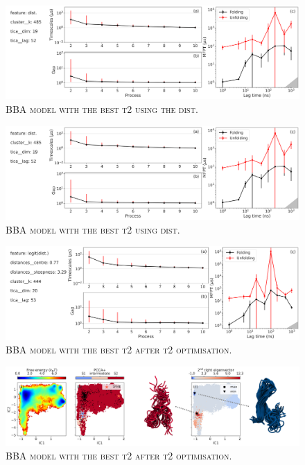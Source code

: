 \documentclass{article}
\begin{document}
\begin{figure}
    \centering
    \includegraphics[width=\columnwidth]{SI_figures/BBA_58_SI-1.png}
    \caption{\textsc{BBA model with the best t2 using the dist.}}
    \label{si_fig:BBA_58_1}
\end{figure}

\begin{figure}
    \centering
    \includegraphics[width=\columnwidth]{SI_figures/BBA_58_SI-1.png}
    \caption{\textsc{BBA model with the best t2 using dist.}}
    \label{si_fig:BBA_58_2}
\end{figure}

\begin{figure}
    \centering
    \includegraphics[width=\columnwidth]{SI_figures/BBA_227_SI-1.png}
    \caption{\textsc{BBA model with the best t2 after t2 optimisation.}}
    \label{si_fig:BBA_227_2}
\end{figure}

\begin{figure}
    \centering
    \includegraphics[width=\columnwidth]{SI_figures/BBA_227_SI-2.png}
    \caption{\textsc{BBA model with the best t2 after t2 optimisation.}}
    \label{si_fig:BBA_227_2}
\end{figure}
\end{document}
